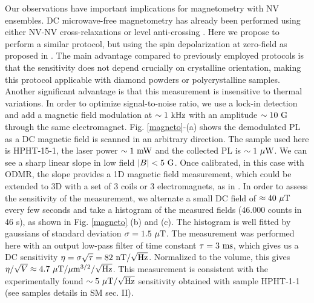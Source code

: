 \documentclass[preprintnumbers,amsmath,amssymb,superscriptaddress,twocolumn,showpacs]{revtex4-2}
\begin{document}
Our observations have important implications for magnetometry with NV ensembles.
DC microwave-free magnetometry has already been performed using either NV-NV cross-relaxations \citep{akhmedzhanov_microwave-free_2017,akhmedzhanov_magnetometry_2019} or level anti-crossing \citep{Wickenbrock, zheng2017level, zheng_microwave-free_2020}. Here we propose to perform a similar protocol, but using the spin depolarization at zero-field as proposed in \cite{filimonenko2018weak, filimonenko2022manifestation}. The main advantage compared to previously employed protocols is that the sensitivity does not depend crucially on crystalline orientation, making this protocol applicable with diamond powders or polycrystalline samples. Another significant advantage is that this measurement is insensitive to thermal variations. In order to optimize signal-to-noise ratio, we use a lock-in detection and add a magnetic field modulation at $\sim 1\ \rm kHz$ with an amplitude $\sim 10\ \rm G$ through the same electromagnet. Fig. \ref{magneto}-(a) shows the demodulated PL as a DC magnetic field is scanned in an arbitrary direction. The sample used here is HPHT-15-1, the laser power $\sim 1\ \rm mW$ and the collected PL is $\sim 1\ \mu\rm W$.  We can see a sharp linear slope in low field $\abs{B} < 5\ \rm G$. Once calibrated, in this case with ODMR, the slope provides a 1D magnetic field measurement, which could be extended to 3D with a set of 3 coils or 3 electromagnets, as in \cite{zheng_microwave-free_2020}. In order to assess the sensitivity of the measurement, we alternate a small DC field of $\approx 40\ \mu\rm{T}$ every few seconds and take a histogram of the measured fields (46.000 counts in 46 s), as shown in Fig. \ref{magneto} (b) and (c). The histogram is well fitted by gaussians of standard deviation $\sigma=1.5\ \mu \rm T$. The measurement was performed here with an output low-pass filter of time constant $\tau=3\ \rm ms$, which gives us a DC sensitivity $\eta=\sigma \sqrt{\tau}=82\ \rm{nT}/\sqrt{\rm Hz}$. Normalized to the volume, this gives $\eta/\sqrt{V}\approx 4.7 \ \mu \rm{T}/\mu m^{3/2}/\sqrt{\rm Hz}$. This measurement is consistent with the experimentally found $\sim 5\ \mu \rm{T}/\sqrt{\rm Hz}$ sensitivity obtained with sample HPHT-1-1 (see samples details in SM sec. II).
\end{document}
